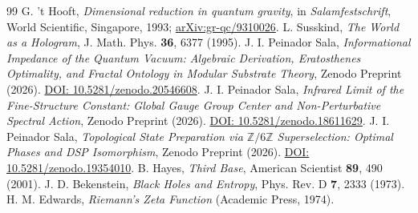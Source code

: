 \documentclass[10pt,a4paper]{article}
\begin{document}
\begin{thebibliography}{99}
 G. 't Hooft, \textit{Dimensional reduction in quantum gravity}, in \emph{Salamfestschrift}, World Scientific, Singapore, 1993; \href{https://arxiv.org/abs/gr-qc/9310026}{arXiv:gr-qc/9310026}.
 L. Susskind, \textit{The World as a Hologram}, J. Math. Phys. \textbf{36}, 6377 (1995).
 J. I. Peinador Sala, \textit{Informational Impedance of the Quantum Vacuum: Algebraic Derivation, Eratosthenes Optimality, and Fractal Ontology in Modular Substrate Theory}, Zenodo Preprint (2026). \href{https://doi.org/10.5281/zenodo.20546608}{DOI: 10.5281/zenodo.20546608}.
 J. I. Peinador Sala, \textit{Infrared Limit of the Fine-Structure Constant: Global Gauge Group Center and Non-Perturbative Spectral Action}, Zenodo Preprint (2026). \href{https://doi.org/10.5281/zenodo.18611629}{DOI: 10.5281/zenodo.18611629}.
 J. I. Peinador Sala, \textit{Topological State Preparation via $\mathbb{Z}/6\mathbb{Z}$ Superselection: Optimal Phases and DSP Isomorphism}, Zenodo Preprint (2026). \href{https://doi.org/10.5281/zenodo.19354010}{DOI: 10.5281/zenodo.19354010}.
 B. Hayes, \textit{Third Base}, American Scientist \textbf{89}, 490 (2001).
 J. D. Bekenstein, \textit{Black Holes and Entropy}, Phys. Rev. D \textbf{7}, 2333 (1973).
 H. M. Edwards, \textit{Riemann's Zeta Function} (Academic Press, 1974).
\end{thebibliography}
\end{document}
